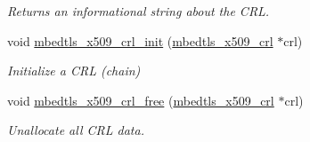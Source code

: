 \begin{DoxyCompactItemize}
\begin{DoxyCompactList}\small\item\em Returns an informational string about the C\+RL. \end{DoxyCompactList}\item 
void \mbox{\hyperlink{group__x509__module_ga8513a192e281217802837571da98e218}{mbedtls\+\_\+x509\+\_\+crl\+\_\+init}} (\mbox{\hyperlink{structmbedtls__x509__crl}{mbedtls\+\_\+x509\+\_\+crl}} $\ast$crl)
\begin{DoxyCompactList}\small\item\em Initialize a C\+RL (chain) \end{DoxyCompactList}\item 
void \mbox{\hyperlink{group__x509__module_gaeb19c3326889f9e493fbd605c1113b96}{mbedtls\+\_\+x509\+\_\+crl\+\_\+free}} (\mbox{\hyperlink{structmbedtls__x509__crl}{mbedtls\+\_\+x509\+\_\+crl}} $\ast$crl)
\begin{DoxyCompactList}\small\item\em Unallocate all C\+RL data. \end{DoxyCompactList}\end{DoxyCompactItemize}
